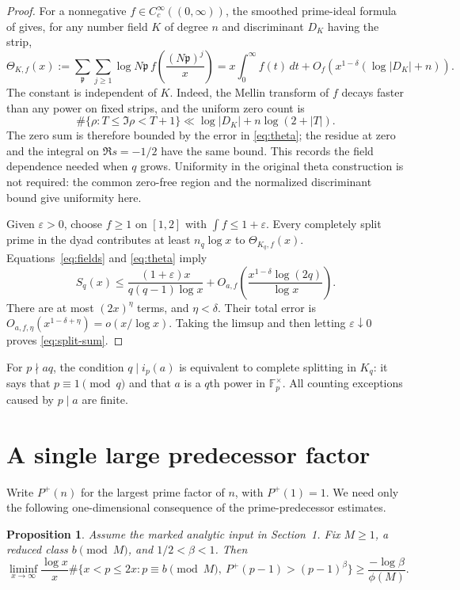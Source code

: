 \documentclass[11pt]{article}
\newtheorem{proposition}[theorem]{Proposition}
\theoremstyle{remark}
\newcommand{\1}{\mathbf 1}
\begin{document}
\begin{proof}
For a nonnegative $f\in C_c^\infty((0,\infty))$, the smoothed
prime-ideal formula of \cite[(9.9)]{OAI} gives, for any number
field $K$ of degree $n$ and discriminant $D_K$ having the strip,
\begin{equation}\label{eq:theta}
 \Theta_{K,f}(x)
 :=\sum_{\mathfrak p}\sum_{j\ge1}
       \log N\mathfrak p\,
       f\!\left(\frac{(N\mathfrak p)^j}{x}\right)
 =x\int_0^\infty f(t)\,dt
  +O_f\!\left(x^{1-\delta}(\log|D_K|+n)\right).
\end{equation}
The constant is independent of $K$.  Indeed, the Mellin transform
of $f$ decays faster than any power on fixed strips, and the
uniform zero count is
\[
 \#\{\rho:T\le\Im\rho<T+1\}
 \ll \log|D_K|+n\log(2+|T|).
\]
The zero sum is therefore bounded by the error in
\eqref{eq:theta}; the residue at zero and the integral on
$\Re s=-1/2$ have the same bound.  This records the field
dependence needed when $q$ grows.  Uniformity in the original
theta construction is not required: the common zero-free region
and the normalized discriminant bound give uniformity here.

Given $\varepsilon>0$, choose $f\ge1$ on $[1,2]$ with
$\int f\le1+\varepsilon$.  Every completely split prime in the
dyad contributes at least $n_q\log x$ to $\Theta_{K_q,f}(x)$.
Equations~\eqref{eq:fields} and \eqref{eq:theta} imply
\[
 S_q(x)\le\frac{(1+\varepsilon)x}{q(q-1)\log x}
       +O_{a,f}\!\left(
          \frac{x^{1-\delta}\log(2q)}{\log x}\right).
\]
There are at most $(2x)^\eta$ terms, and $\eta<\delta$.
Their total error is $O_{a,f,\eta}(x^{1-\delta+\eta})
=o(x/\log x)$.  Taking the limsup and then letting
$\varepsilon\downarrow0$ proves \eqref{eq:split-sum}.
\end{proof}

For $p\nmid aq$, the condition $q\mid i_p(a)$ is equivalent to
complete splitting in $K_q$: it says that $p\equiv1\pmod q$
and that $a$ is a $q$th power in $\mathbb F_p^\times$.
All counting exceptions caused by $p\mid a$ are finite.

\section{A single large predecessor factor}\label{sec:large}

Write $P^+(n)$ for the largest prime factor of $n$, with
$P^+(1)=1$.  We need only the following one-dimensional
consequence of the prime-predecessor estimates.

\begin{proposition}\label{prop:large}
Assume the marked analytic input in Section~1.  Fix $M\ge1$,
a reduced class $b\pmod M$, and $1/2<\beta<1$.  Then
\begin{equation}\label{eq:large}
 \liminf_{x\to\infty}\frac{\log x}{x}
 \#\{x<p\le2x:p\equiv b\pmod M,
             \ P^+(p-1)>(p-1)^\beta\}
 \ge\frac{-\log\beta}{\phi(M)}.
\end{equation}
\end{proposition}
\end{document}
